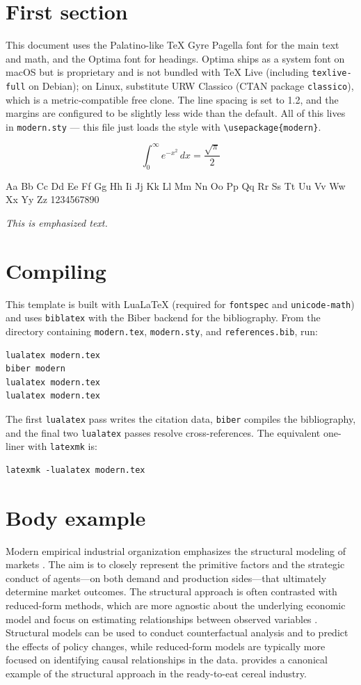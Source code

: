 \documentclass[11pt, letterpaper]{article}
\begin{document}
\section{First section}
This document uses the Palatino-like TeX Gyre Pagella font for the main text and
math, and the Optima font for headings. Optima ships as a system font on macOS
but is proprietary and is not bundled with TeX Live (including
\texttt{texlive-full} on Debian); on Linux, substitute URW Classico (CTAN
package \texttt{classico}), which is a metric-compatible free clone. The line
spacing is set to 1.2, and the margins are configured to be slightly less wide
than the default. All of this lives in \texttt{modern.sty} --- this file just
loads the style with \verb|\usepackage{modern}|.

$$ \int_0^\infty e^{-x^2}\, dx = \frac{\sqrt{\pi}}{2} $$

Aa Bb Cc Dd Ee Ff Gg Hh Ii Jj Kk Ll Mm Nn Oo Pp Qq Rr Ss Tt Uu Vv Ww Xx Yy Zz
1234567890

\emph{This is emphasized text.}

\section{Compiling}
This template is built with Lua\LaTeX{} (required for \texttt{fontspec} and
\texttt{unicode-math}) and uses \texttt{biblatex} with the Biber backend for
the bibliography. From the directory containing \texttt{modern.tex},
\texttt{modern.sty}, and \texttt{references.bib}, run:

\begin{verbatim}
lualatex modern.tex
biber modern
lualatex modern.tex
lualatex modern.tex
\end{verbatim}

The first \texttt{lualatex} pass writes the citation data, \texttt{biber}
compiles the bibliography, and the final two \texttt{lualatex} passes resolve
cross-references. The equivalent one-liner with \texttt{latexmk} is:

\begin{verbatim}
latexmk -lualatex modern.tex
\end{verbatim}

\section{Body example}
Modern empirical industrial organization emphasizes the structural modeling of
markets \citep{ackerberg2007econometric}. The aim is to closely represent the
primitive factors and the strategic conduct of agents---on both demand and
production sides---that ultimately determine market outcomes. The structural
approach is often contrasted with reduced-form methods, which are more agnostic
about the underlying economic model and focus on estimating relationships
between observed variables \citep{angrist2010credibility}. Structural models can
be used to conduct counterfactual analysis and to predict the effects of policy
changes, while reduced-form models are typically more focused on identifying
causal relationships in the data. \citet{nevo2001measuring} provides a canonical
example of the structural approach in the ready-to-eat cereal industry.

\printbibliography
\end{document}
